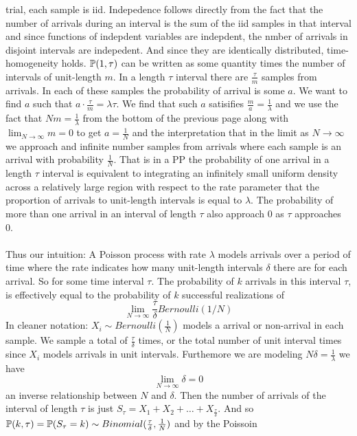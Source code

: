 \documentclass[11pt]{scrartcl}
\begin{document}
 trial, each sample is iid. Indepedence follows directly from the fact that the
 number of arrivals during an interval is the sum of the iid samples in that
 interval and since functions of indepdent variables are indepdent, the nmber
 of arrivals in disjoint intervals are indepedent. And since they are
 identically distributed, time-homogeneity holds. $\mathbb{P}(1,\tau)$ can be written
 as some quantity times the number of intervals of unit-length $m$. In a length
 $\tau$ interval there are $\frac{\tau}{m}$ samples from arrivals. In each of
 these samples the probability of arrival is some $a$. We want to find $a$ such
 that $a\cdot \frac{\tau}{m} = \lambda \tau$. We find that such $a$ satisifies
 $\frac{m}{a}= \frac{1}{\lambda}$ and we use the fact that $Nm=\frac{1}{\lambda
 }$ from the bottom of the previous page along with $\lim_{N\to \infty} m = 0$
 to get $a=\frac{1}{N}$ and the interpretation that in the limit as $N\to
 \infty$ we approach and infinite number samples from arrivals where each
 sample is an arrival with probability $\frac{1}{N}$. That is in a PP the
 probability of one arrival in a length $\tau$ interval is equivalent to
 integrating an infinitely small uniform density across a relatively large
 region with respect to the rate parameter that the proportion of arrivals to
 unit-length intervals is equal to $\lambda $. The probability of more than one
 arrival in an interval of length $\tau$ also approach 0 as $\tau$ approaches
 0. \\\\ Thus our intuition: A Poisson process with rate $\lambda $ models
    arrivals over a period of time where the rate indicates how many
    unit-length intervals $\delta$ there are for each arrival. So for some time
    interval $\tau$. The probability of $k$ arrivals in this interval $\tau$,
    is effectively equal to the probability of $k$ successful realizations of
    $$\lim_{N\to \infty}\frac{\tau}{\delta} Bernoulli(1/N)$$ 
    In cleaner notation: $X_{i}\sim Bernoulli(\frac{1}{N})$ models a arrival or
    non-arrival in each sample. We sample a total of $\frac{\tau}{\delta}$
    times, or the total number of unit interval times since $X_i$ models
    arrivals in unit intervals. Furthemore we are modeling 
    $N\delta = \frac{1}{\lambda }$  we have $$\lim_{N\to\infty}\delta =0$$ an
    inverse relationship between $N $ and $\delta$. Then the number of arrivals
    of the interval of length $\tau$ is just $S_{\tau} = X_1 + X_2 + \ldots
    + X_{\frac{\tau}{\delta}}$. And so $\mathbb{P}(k, \tau) = \mathbb{P}(S_{\tau} = k) \sim
    Binomial(\frac{\tau}{\delta}, \frac{1}{N})$ and by the Poissoin
\end{document}
